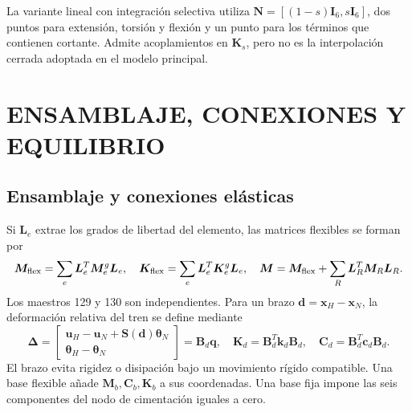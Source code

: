 \documentclass[oneside,a4paper,spanish,links,pagenumbers]{amca}
\newcommand{\I}{\bm I}
\begin{document}
La variante lineal con integración selectiva utiliza $\bm N=[(1-s)\I_6,s\I_6]$, dos puntos para extensión, torsión y flexión y un punto para los términos que contienen cortante. Admite acoplamientos en $\bm K_s$, pero no es la interpolación cerrada adoptada en el modelo principal.

\section{ENSAMBLAJE, CONEXIONES Y EQUILIBRIO}
\subsection{Ensamblaje y conexiones elásticas}
Si $\bm L_e$ extrae los grados de libertad del elemento, las matrices flexibles se forman por
\begin{equation}
\bm M_{\rm flex}=\sum_e\bm L_e^T\bm M_e^g\bm L_e,
\quad
\bm K_{\rm flex}=\sum_e\bm L_e^T\bm K_e^g\bm L_e,
\quad
\bm M=\bm M_{\rm flex}+\sum_R\bm L_R^T\bm M_R\bm L_R.
\end{equation}
Los maestros 129 y 130 son independientes. Para un brazo $\bm d=\bm x_H-\bm x_N$, la deformación relativa del tren se define mediante
\begin{equation}
\bm\Delta=
\begin{bmatrix}
\bm u_H-\bm u_N+\bm S(\bm d)\bm\theta_N\\
\bm\theta_H-\bm\theta_N
\end{bmatrix}=\bm B_d\bm q,
\quad
\bm K_d=\bm B_d^T\bm k_d\bm B_d,
\quad
\bm C_d=\bm B_d^T\bm c_d\bm B_d.
\end{equation}
El brazo evita rigidez o disipación bajo un movimiento rígido compatible. Una base flexible añade $\bm M_b,\bm C_b,\bm K_b$ a sus coordenadas. Una base fija impone las seis componentes del nodo de cimentación iguales a cero.
\end{document}
